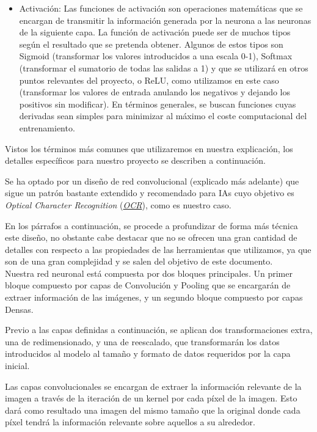 \documentclass{article}
\begin{document}
\begin{itemize}
	\item Activación: Las funciones de activación son operaciones matemáticas que se encargan de  transmitir la información generada por la neurona a las neuronas de la siguiente capa. La función de activación puede ser de muchos tipos según el resultado que se pretenda obtener. Algunos de estos tipos son Sigmoid (transformar los valores introducidos a una escala 0-1), Softmax (transformar el sumatorio de todas las salidas a 1) y que se utilizará en otros puntos relevantes del proyecto, o ReLU, como utilizamos en este caso (transformar los valores de entrada anulando los negativos y dejando los positivos sin modificar). En términos generales, se buscan funciones cuyas derivadas sean simples para minimizar al máximo el coste computacional del entrenamiento.

\end{itemize}

Vistos los términos más comunes que utilizaremos en nuestra explicación, los detalles específicos para nuestro proyecto se describen a continuación.

Se ha optado por un diseño de red convolucional (explicado más adelante) que sigue un patrón bastante extendido y recomendado para IAs cuyo objetivo es \textit{Optical Character Recognition} (\hyperref[sec:terms]{\textit{OCR}\tec}), como es nuestro caso.

En los párrafos a continuación, se procede a profundizar de forma más técnica este diseño, no obstante cabe destacar que no se ofrecen una gran cantidad de detalles con respecto a las propiedades de las herramientas que utilizamos, ya que son de una gran complejidad y se salen del objetivo de este documento.\\

Nuestra red neuronal está compuesta por dos bloques principales. Un primer bloque compuesto por capas de Convolución y Pooling que se encargarán de extraer información de las imágenes, y un segundo bloque compuesto por capas Densas.

Previo a las capas definidas a continuación, se aplican dos transformaciones extra, una de redimensionado, y una de reescalado, que transformarán los datos introducidos al modelo al tamaño y formato de datos requeridos por la capa inicial.

Las capas convolucionales se encargan de extraer la información relevante de la imagen a través de la iteración de un kernel por cada píxel de la imagen. Esto dará como resultado una imagen del mismo tamaño que la original donde cada píxel tendrá la información relevante sobre aquellos a su alrededor.
\end{document}
